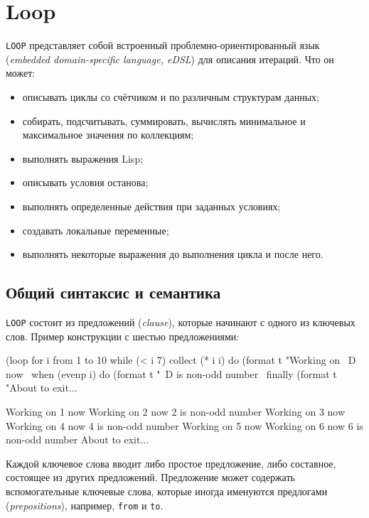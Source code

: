 \section{Loop}
\lstinline{LOOP} представляет собой встроенный проблемно-ориентированный язык (\emph{embedded domain-specific language, eDSL}) для описания итераций. Что он может:
\begin{itemize}
  \item описывать циклы со счётчиком и по различным структурам данных;
  \item собирать, подсчитывать, суммировать, вычислять минимальное и максимальное значения по коллекциям;
  \item выполнять выражения Lisp;
  \item описывать условия останова;
  \item выполнять определенные действия при заданных условиях;
  \item создавать локальные переменные;
  \item выполнять некоторые выражения до выполнения цикла и после него.
\end{itemize}

\subsection{Общий синтаксис и семантика}
\lstinline{LOOP} состоит из предложений (\emph{clause}), которые начинают с одного из ключевых слов. Пример конструкции с шестью предложениями:
\begin{cllst}{}{}
(loop for i from 1 to 10
   while (< i 7)
   collect (* i i)
   do (format t "Working on ~D now~%
   when (evenp i)
     do (format t "~D is non-odd number~%
   finally (format t "About to exit...~%
\end{cllst}
\begin{plainlst}{}{}
Working on 1 now
Working on 2 now
2 is non-odd number
Working on 3 now
Working on 4 now
4 is non-odd number
Working on 5 now
Working on 6 now
6 is non-odd number
About to exit...
\end{plainlst}

Каждой ключевое слова вводит либо простое предложение, либо составное, состоящее из других предложений. Предложение может содержать вспомогательные ключевые слова, которые иногда именуются предлогами (\emph{prepositions}), например, \lstinline{from} и \lstinline{to}.

